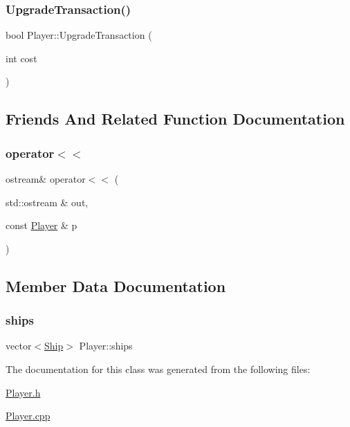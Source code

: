 \subsubsection{\texorpdfstring{Upgrade\+Transaction()}{UpgradeTransaction()}}
{\footnotesize\ttfamily bool Player\+::\+Upgrade\+Transaction (\begin{DoxyParamCaption}\item[{int}]{cost }\end{DoxyParamCaption})}



\subsection{Friends And Related Function Documentation}
\mbox{\label{class_player_a8df091e01a62dda54c43c277fe953118}} 
\subsubsection{\texorpdfstring{operator$<$$<$}{operator<<}}
{\footnotesize\ttfamily ostream\& operator$<$$<$ (\begin{DoxyParamCaption}\item[{std\+::ostream \&}]{out,  }\item[{const \hyperlink{class_player}{Player} \&}]{p }\end{DoxyParamCaption})\hspace{0.3cm}{\ttfamily [friend]}}



\subsection{Member Data Documentation}
\mbox{\label{class_player_ab6c034dcfbb08a9346be1cff7a607cfa}} 
\subsubsection{\texorpdfstring{ships}{ships}}
{\footnotesize\ttfamily vector$<$\hyperlink{class_ship}{Ship}$>$ Player\+::ships}



The documentation for this class was generated from the following files\+:\begin{DoxyCompactItemize}
\item 
\hyperlink{_player_8h}{Player.\+h}\item 
\hyperlink{_player_8cpp}{Player.\+cpp}\end{DoxyCompactItemize}
